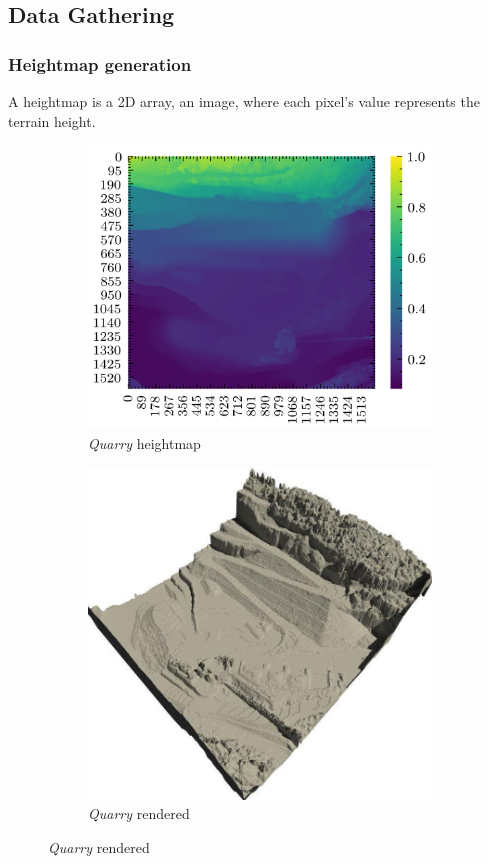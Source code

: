 \documentclass[../document.tex]{subfiles}
\begin{document}
\subsection{Data Gathering}
\subsubsection{Heightmap generation}
A heightmap is a 2D array, an image, where each pixel's value represents the terrain height.

\begin{figure}[H]
    \centering
        \begin{subfigure}[b]{0.45\textwidth}
            \includegraphics[width=\textwidth]{../img/hm/querry-big-10.png}
            \caption{\emph{Quarry} heightmap}
        \end{subfigure}
        \begin{subfigure}[b]{0.45\linewidth}
            \includegraphics[width=\textwidth]{../img/quarry-rendered.png}
            \caption{\emph{Quarry} rendered}
            \end{subfigure}    
    \end{figure}
\end{document}
